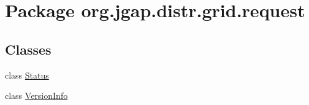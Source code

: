 \hypertarget{namespaceorg_1_1jgap_1_1distr_1_1grid_1_1request}{\section{Package org.\-jgap.\-distr.\-grid.\-request}
\label{namespaceorg_1_1jgap_1_1distr_1_1grid_1_1request}
}
\subsection*{Classes}
\begin{DoxyCompactItemize}
\item 
class \hyperlink{classorg_1_1jgap_1_1distr_1_1grid_1_1request_1_1_status}{Status}
\item 
class \hyperlink{classorg_1_1jgap_1_1distr_1_1grid_1_1request_1_1_version_info}{Version\-Info}
\end{DoxyCompactItemize}
